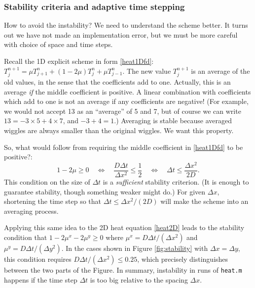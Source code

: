 \documentclass[titlepage,a4paper,final,12pt]{scrartcl}
\begin{document}

\subsubsection*{Stability criteria and adaptive time stepping}  How to avoid the instability?  We need to understand the scheme better.  It turns out we have not made an implementation error, but we must be more careful with choice of space and time steps.

Recall the 1D explicit scheme in form \eqref{heat1Dfd}: $T_j^{n+1} = \mu T_{j+1}^n + (1 - 2 \mu) T_j^n + \mu T_{j-1}^n$.  The new value $T_j^{n+1}$ is an average of the old values, in the sense that the coefficients add to one.  Actually, this is an average \emph{if} the middle coefficient is positive.  A linear combination with coefficients which add to one is not an average if any coefficients are negative!  (For example, we would not accept 13 as an ``average'' of 5 and 7, but of course we can write $13 = -3 \times 5 + 4 \times 7$, and $-3+4=1$.)  Averaging is stable because averaged wiggles are always smaller than the original wiggles.  We want this property.

So, what would follow from requiring the middle coefficient in \eqref{heat1Dfd} to be positive?:
\begin{equation}
   1 - 2 \mu \ge 0 \quad \iff \quad \frac{D\Delta t}{\Delta x^2} \le \frac{1}{2} \quad \iff \quad \Delta t \le \frac{\Delta x^2}{2 D}.  \label{stabcrit}
\end{equation}
This condition on the size of $\Delta t$ is a \emph{sufficient} stability criterion.  (It is enough to guarantee stability, though something weaker might do.)  For given $\Delta x$, shortening the time step so that $\Delta t \le \Delta x^2/(2 D)$ will make the scheme into an averaging process.

Applying this same idea to the 2D heat equation \eqref{heat2D} leads to the stability condition that $1-2\mu^x-2\mu^y \ge 0$ where $\mu^x = D \Delta t / (\Delta x^2)$ and $\mu^y = D \Delta t / (\Delta y^2)$.  In the cases shown in Figure  \ref{fig:stability} with $\Delta x=\Delta y$, this condition requires $D \Delta t /(\Delta x^2) \le 0.25$, which precisely distinguishes between the two parts of the Figure.  In summary, instability in runs of \texttt{heat.m} happens if the time step $\Delta t$ is too big relative to the spacing $\Delta x$.
\end{document}
